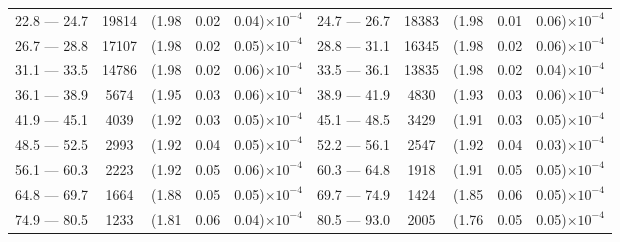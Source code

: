 \begin{table}[p]
\begin{tabular}{c|c|ccc  c|c|ccc}
22.8 — 24.7  &  19814                &(1.98                                &  0.02                   &      0.04)$\times 10^{-4}$  & 24.7 — 26.7  &  18383                 &(1.98                                &  0.01                   &      0.06)$\times 10^{-4}$ \\
26.7 — 28.8  &  17107                &(1.98                                &  0.02                   &      0.05)$\times 10^{-4}$  & 28.8 — 31.1  &  16345                 &(1.98                                &  0.02                   &      0.06)$\times 10^{-4}$ \\
31.1 — 33.5  &  14786                &(1.98                                &  0.02                   &      0.06)$\times 10^{-4}$  & 33.5 — 36.1  &  13835                 &(1.98                                &  0.02                   &      0.04)$\times 10^{-4}$ \\
36.1 — 38.9  &  5674                  &(1.95                                &  0.03                   &      0.06)$\times 10^{-4}$  & 38.9 — 41.9  &  4830                   &(1.93                                &  0.03                   &      0.06)$\times 10^{-4}$ \\
41.9 — 45.1  &  4039                  &(1.92                                &  0.03                   &      0.05)$\times 10^{-4}$  & 45.1 — 48.5  &  3429                   &(1.91                                &  0.03                   &      0.05)$\times 10^{-4}$ \\
48.5 — 52.5  &  2993                  &(1.92                                &  0.04                   &      0.05)$\times 10^{-4}$  & 52.2 — 56.1  &  2547                   &(1.92                                &  0.04                   &      0.03)$\times 10^{-4}$ \\
56.1 — 60.3  &  2223                  &(1.92                                &  0.05                   &      0.06)$\times 10^{-4}$  & 60.3 — 64.8  &  1918                   &(1.91                                &  0.05                   &      0.05)$\times 10^{-4}$ \\
64.8 — 69.7  &  1664                  &(1.88                                &  0.05                   &      0.05)$\times 10^{-4}$  & 69.7 — 74.9  &  1424                   &(1.85                                &  0.06                   &      0.05)$\times 10^{-4}$ \\
74.9 — 80.5  &  1233                  &(1.81                                &  0.06                   &      0.04)$\times 10^{-4}$  & 80.5 — 93.0  &  2005                   &(1.76                                &  0.05                   &      0.05)$\times 10^{-4}$ \\

\end{tabular}
\end{table}
